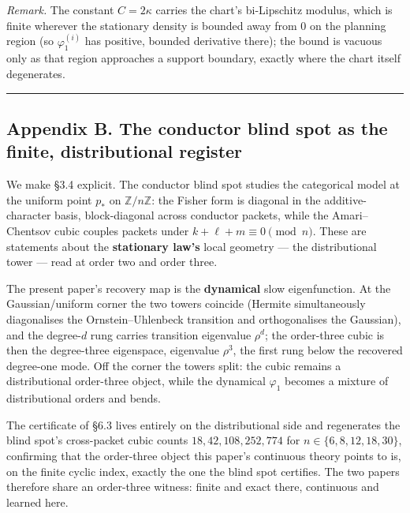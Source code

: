 \documentclass[
  letterpaper,
  11pt]{article}
\theoremstyle{plain}
\theoremstyle{definition}
\theoremstyle{remark}
\begin{document}
\emph{Remark.} The constant \(C=2\kappa\) carries the chart's bi-Lipschitz modulus, which is finite wherever the stationary density is bounded away from \(0\) on the planning region (so \(\varphi_1^{(i)}\) has positive, bounded derivative there); the bound is vacuous only as that region approaches a support boundary, exactly where the chart itself degenerates.

\begin{center}\rule{0.5\linewidth}{0.5pt}\end{center}

\subsection{Appendix B. The conductor blind spot as the finite, distributional register}\label{sec:appB}

We make §3.4 explicit. The conductor blind spot studies the categorical model at the uniform point \(p_*\) on \(\mathbb Z/n\mathbb Z\): the Fisher form is diagonal in the additive-character basis, block-diagonal across conductor packets, while the Amari--Chentsov cubic couples packets under \(k+\ell+m\equiv 0\pmod n\). These are statements about the \textbf{stationary law's} local geometry --- the distributional tower --- read at order two and order three.

The present paper's recovery map is the \textbf{dynamical} slow eigenfunction. At the Gaussian/uniform corner the two towers coincide (Hermite simultaneously diagonalises the Ornstein--Uhlenbeck transition and orthogonalises the Gaussian), and the degree-\(d\) rung carries transition eigenvalue \(\rho^d\); the order-three cubic is then the degree-three eigenspace, eigenvalue \(\rho^3\), the first rung below the recovered degree-one mode. Off the corner the towers split: the cubic remains a distributional order-three object, while the dynamical \(\varphi_1\) becomes a mixture of distributional orders and bends.

The certificate of §6.3 lives entirely on the distributional side and regenerates the blind spot's cross-packet cubic counts \(18,42,108,252,774\) for \(n\in\{6,8,12,18,30\}\), confirming that the order-three object this paper's continuous theory points to is, on the finite cyclic index, exactly the one the blind spot certifies. The two papers therefore share an order-three witness: finite and exact there, continuous and learned here.
\end{document}
